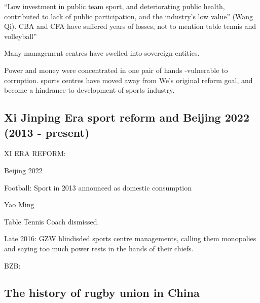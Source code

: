     ``Low investment in public team sport, and deteriorating public health, contributed to lack of public participation, and the industry’s low value'' (Wang Qi). CBA and CFA have suffered years of losses, not to mention table tennis and volleyball”

    Many management centres have swelled into sovereign entities.

    Power and money were concentrated in one pair of hands -vulnerable to corruption.  sports centres have moved away from We’s original reform goal, and become a hindrance to development of sports industry.

\subsection{Xi Jinping Era sport reform and Beijing 2022 (2013 - present)}

    XI ERA REFORM:

    Beijing 2022

    Football:
    Sport in 2013 announced as domestic consumption

    Yao Ming

    Table Tennis Coach dismissed.

    Late 2016:  GZW blindisded sports centre managements, calling them monopolies and saying too much power rests in the hands of their chiefs.


    BZB:



  \subsection{The history of rugby union in China}


